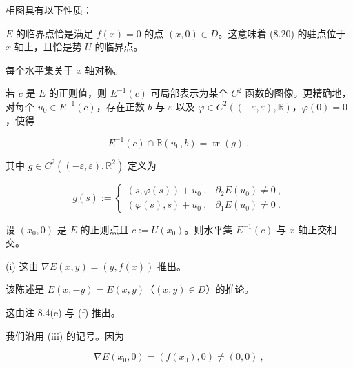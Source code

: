 \begin{example}
相图具有以下性质：

\begin{subitems}
\item

$ E $ 的临界点恰是满足 $ f(x)=0 $ 的点 $ (x,0)\in D $。这意味着 (8.20) 的驻点位于 $ x $ 轴上，且恰是势 $ U $ 的临界点。

\item

每个水平集关于 $ x $ 轴对称。

\item

若 $ c $ 是 $ E $ 的正则值，则 $ E^{-1}(c) $ 可局部表示为某个 $ C^{2} $ 函数的图像。更精确地，对每个 $ u_{0}\in E^{-1}(c) $，存在正数 $ b $ 与 $ \varepsilon $ 以及 $ \varphi\in C^{2}((-\varepsilon,\varepsilon),\mathbb{R}) $，$ \varphi(0)=0 $，使得

\begin{equation}
E^{-1}(c)\cap\mathbb{B}(u_{0},b)=\operatorname{tr}(g)\ ,\tag{8.22}
\end{equation}

其中 $ g\in C^{2}((-\varepsilon,\varepsilon),\mathbb{R}^{2}) $ 定义为

\begin{equation*}
g(s):=\begin{cases}(s,\varphi(s))+u_{0}\ , & \partial_{2}E(u_{0})\ne 0\ ,\\ (\varphi(s),s)+u_{0}\ , & \partial_{1}E(u_{0})\ne 0\ .\end{cases}
\end{equation*}
\item

设 $ (x_{0},0) $ 是 $ E $ 的正则点且 $ c:=U(x_{0}) $。则水平集 $ E^{-1}(c) $ 与 $ x $ 轴正交相交。

\proofhead
(i) 这由 $ \nabla E(x,y)=(y,f(x)) $ 推出。
\end{subitems}

\begin{subitems}
\item[（ii）]

该陈述是 $ E(x,-y)=E(x,y) $（$ (x,y)\in D $）的推论。

\item[（iii）]

这由注 8.4(e) 与 (f) 推出。

\item[（iv）]

我们沿用 (iii) 的记号。因为

\[
\nabla E(x_{0},0)=(f(x_{0}),0)\ne(0,0)\ ,
\]


\end{subitems}
\end{example}
